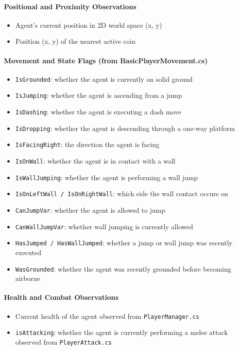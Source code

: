 \documentclass[12pt,oneside,openright,a4paper]{cpe-english-project}
\begin{document}
\paragraph{Positional and Proximity Observations}
\begin{itemize}
\item Agent’s current position in 2D world space (x, y)
\item Position (x, y) of the nearest active coin
\end{itemize}

\paragraph{Movement and State Flags (from BasicPlayerMovement.cs)}
\begin{itemize}
\item \texttt{IsGrounded}: whether the agent is currently on solid ground
\item \texttt{IsJumping}: whether the agent is ascending from a jump
\item \texttt{IsDashing}: whether the agent is executing a dash move
\item \texttt{IsDropping}: whether the agent is descending through a one-way platform
\item \texttt{IsFacingRight}: the direction the agent is facing
\item \texttt{IsOnWall}: whether the agent is in contact with a wall
\item \texttt{IsWallJumping}: whether the agent is performing a wall jump
\item \texttt{IsOnLeftWall / IsOnRightWall}: which side the wall contact occurs on
\item \texttt{CanJumpVar}: whether the agent is allowed to jump
\item \texttt{CanWallJumpVar}: whether wall jumping is currently allowed
\item \texttt{HasJumped / HasWallJumped}: whether a jump or wall jump was recently executed
\item \texttt{WasGrounded}: whether the agent was recently grounded before becoming airborne
\end{itemize}

\paragraph{Health and Combat Observations}
\begin{itemize}
\item Current health of the agent observed from \texttt{PlayerManager.cs}
\item \texttt{isAttacking}: whether the agent is currently performing a melee attack observed from \texttt{PlayerAttack.cs}
\end{itemize}
\end{document}
